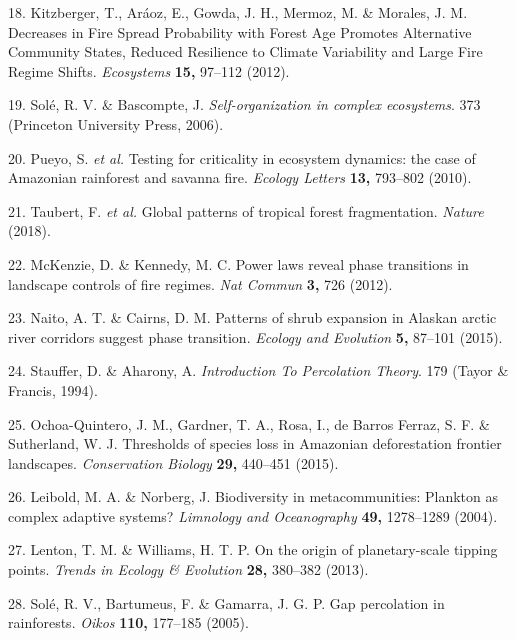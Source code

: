 \documentclass[]{article}
\begin{document}
\hypertarget{ref-Kitzberger2012}{}
18. Kitzberger, T., Aráoz, E., Gowda, J. H., Mermoz, M. \& Morales, J.
M. Decreases in Fire Spread Probability with Forest Age Promotes
Alternative Community States, Reduced Resilience to Climate Variability
and Large Fire Regime Shifts. \emph{Ecosystems} \textbf{15,} 97--112
(2012).

\hypertarget{ref-Sole2006}{}
19. Solé, R. V. \& Bascompte, J. \emph{Self-organization in complex
ecosystems}. 373 (Princeton University Press, 2006).

\hypertarget{ref-Pueyo2010}{}
20. Pueyo, S. \emph{et al.} Testing for criticality in ecosystem
dynamics: the case of Amazonian rainforest and savanna fire.
\emph{Ecology Letters} \textbf{13,} 793--802 (2010).

\hypertarget{ref-Taubert2018}{}
21. Taubert, F. \emph{et al.} Global patterns of tropical forest
fragmentation. \emph{Nature} (2018).

\hypertarget{ref-McKenzie2012}{}
22. McKenzie, D. \& Kennedy, M. C. Power laws reveal phase transitions
in landscape controls of fire regimes. \emph{Nat Commun} \textbf{3,} 726
(2012).

\hypertarget{ref-Naito2015}{}
23. Naito, A. T. \& Cairns, D. M. Patterns of shrub expansion in Alaskan
arctic river corridors suggest phase transition. \emph{Ecology and
Evolution} \textbf{5,} 87--101 (2015).

\hypertarget{ref-Stauffer1994}{}
24. Stauffer, D. \& Aharony, A. \emph{Introduction To Percolation
Theory}. 179 (Tayor \& Francis, 1994).

\hypertarget{ref-Ochoa-Quintero2015}{}
25. Ochoa-Quintero, J. M., Gardner, T. A., Rosa, I., de Barros Ferraz,
S. F. \& Sutherland, W. J. Thresholds of species loss in Amazonian
deforestation frontier landscapes. \emph{Conservation Biology}
\textbf{29,} 440--451 (2015).

\hypertarget{ref-Leibold2004a}{}
26. Leibold, M. A. \& Norberg, J. Biodiversity in metacommunities:
Plankton as complex adaptive systems? \emph{Limnology and Oceanography}
\textbf{49,} 1278--1289 (2004).

\hypertarget{ref-Lenton2013}{}
27. Lenton, T. M. \& Williams, H. T. P. On the origin of planetary-scale
tipping points. \emph{Trends in Ecology \& Evolution} \textbf{28,}
380--382 (2013).

\hypertarget{ref-Sole2005}{}
28. Solé, R. V., Bartumeus, F. \& Gamarra, J. G. P. Gap percolation in
rainforests. \emph{Oikos} \textbf{110,} 177--185 (2005).
\end{document}

